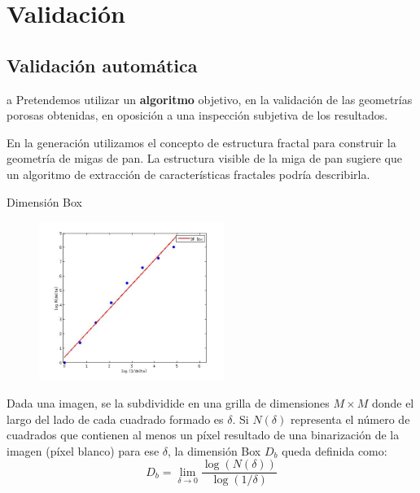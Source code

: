 \documentclass[spanish]{beamer}
\begin{document}
\section{Validación}
\subsection{Validación automática}

\begin{frame}{a}
Pretendemos utilizar un \textbf{algoritmo} objetivo, en la validación de las geometrías porosas obtenidas, en oposición a una inspección subjetiva de los resultados.

En la generación utilizamos el concepto de estructura fractal para construir la geometría de migas de pan.
La estructura visible de la miga de pan sugiere que un algoritmo de extracción de características fractales podría describirla.


\end{frame}

\begin{frame}{Dimensión Box}

\begin{figure}
\includegraphics[width=6cm]{../figures/fitbox}
\end{figure}

Dada una imagen, se la subdividide en una grilla de dimensiones $M\times M$ donde el largo del lado de cada cuadrado formado es $\delta$. Si $N(\delta)$ representa el n\'umero de cuadrados que contienen al menos un p\'ixel resultado de una binarizaci\'on de la imagen (p\'ixel blanco) para ese $\delta$, la dimensi\'on Box $D_{b}$ queda definida como:\\

$$D_{b} = \displaystyle\lim_{\delta \to 0}{\frac{\log(N(\delta))}{\log (1/\delta)}}$$


\end{frame}
\end{document}
